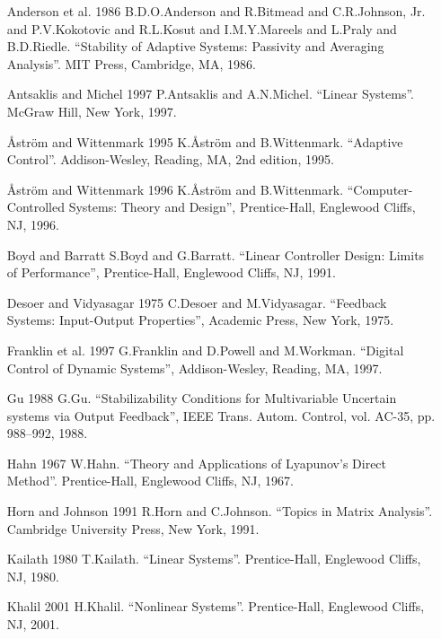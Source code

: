 \documentclass[UTF8,12pt,a4paper]{ctexart}
\theoremstyle{definition}
\begin{document}
\begin{enumerate}
\item [Anderson et al. 1986] B.D.O.Anderson and R.Bitmead and C.R.Johnson, Jr. and P.V.Kokotovic and R.L.Kosut and I.M.Y.Mareels and L.Praly and B.D.Riedle. ``Stability of Adaptive Systems: Passivity and Averaging Analysis''. MIT Press, Cambridge, MA, 1986.

\item [Antsaklis and Michel 1997] P.Antsaklis and A.N.Michel. ``Linear Systems''. McGraw Hill, New York, 1997.

\item [Åström and Wittenmark 1995] K.Åström and B.Wittenmark. ``Adaptive Control''. Addison-Wesley, Reading, MA, 2nd edition, 1995.

\item [Åström and Wittenmark 1996] K.Åström and B.Wittenmark. ``Computer-Controlled Systems: Theory and Design'', Prentice-Hall, Englewood Cliffs, NJ, 1996.

\item [Boyd and Barratt] S.Boyd and G.Barratt. ``Linear Controller Design: Limits of Performance'', Prentice-Hall, Englewood Cliffs, NJ, 1991.

\item [Desoer and Vidyasagar 1975] C.Desoer and M.Vidyasagar. ``Feedback Systems: Input-Output Properties'', Academic Press, New York, 1975.

\item [Franklin et al. 1997] G.Franklin and D.Powell and M.Workman. ``Digital Control of Dynamic Systems'', Addison-Wesley, Reading, MA, 1997.

\item [Gu 1988] G.Gu. ``Stabilizability Conditions for Multivariable Uncertain systems via Output Feedback'', IEEE Trans. Autom. Control, vol. AC-35, pp. 988--992, 1988.

\item [Hahn 1967] W.Hahn. ``Theory and Applications of Lyapunov's Direct Method''. Prentice-Hall, Englewood Cliffs, NJ, 1967.

\item [Horn and Johnson 1991] R.Horn and C.Johnson. ``Topics in Matrix Analysis''. Cambridge University Press, New York, 1991.

\item [Kailath 1980] T.Kailath. ``Linear Systems''. Prentice-Hall, Englewood Cliffs, NJ, 1980.

\item [Khalil 2001] H.Khalil. ``Nonlinear Systems''. Prentice-Hall, Englewood Cliffs, NJ, 2001.


\end{enumerate}
\end{document}
